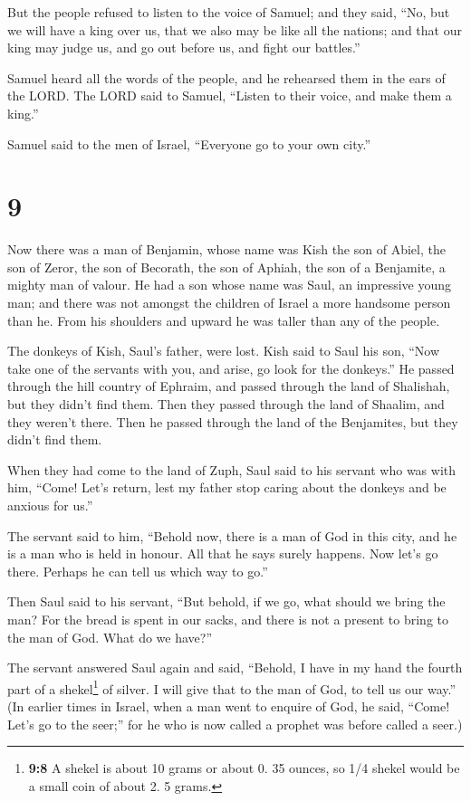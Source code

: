  But the people refused to listen to the voice of Samuel;
and they said, ``No, but we will have a king over us, 
that we also may be like all the nations; and that our king may judge
us, and go out before us, and fight our battles.''

 Samuel heard all the words of the people, and he
rehearsed them in the ears of the LORD.  The LORD said to
Samuel, ``Listen to their voice, and make them a king.''

Samuel said to the men of Israel, ``Everyone go to your own city.''

\hypertarget{section-8}{%
\section{9}\label{section-8}}

 Now there was a man of Benjamin, whose name was Kish the
son of Abiel, the son of Zeror, the son of Becorath, the son of Aphiah,
the son of a Benjamite, a mighty man of valour.  He had a
son whose name was Saul, an impressive young man; and there was not
amongst the children of Israel a more handsome person than he. From his
shoulders and upward he was taller than any of the people.

 The donkeys of Kish, Saul's father, were lost. Kish said
to Saul his son, ``Now take one of the servants with you, and arise, go
look for the donkeys.''  He passed through the hill
country of Ephraim, and passed through the land of Shalishah, but they
didn't find them. Then they passed through the land of Shaalim, and they
weren't there. Then he passed through the land of the Benjamites, but
they didn't find them.

 When they had come to the land of Zuph, Saul said to his
servant who was with him, ``Come! Let's return, lest my father stop
caring about the donkeys and be anxious for us.''

 The servant said to him, ``Behold now, there is a man of
God in this city, and he is a man who is held in honour. All that he
says surely happens. Now let's go there. Perhaps he can tell us which
way to go.''

 Then Saul said to his servant, ``But behold, if we go,
what should we bring the man? For the bread is spent in our sacks, and
there is not a present to bring to the man of God. What do we have?''

 The servant answered Saul again and said, ``Behold, I
have in my hand the fourth part of a shekel\footnote{\textbf{9:8} A
  shekel is about 10 grams or about 0. 35 ounces, so 1/4 shekel would be
  a small coin of about 2. 5 grams.} of silver. I will give that to the
man of God, to tell us our way.''  (In earlier times in
Israel, when a man went to enquire of God, he said, ``Come! Let's go to
the seer;'' for he who is now called a prophet was before called a
seer.)

